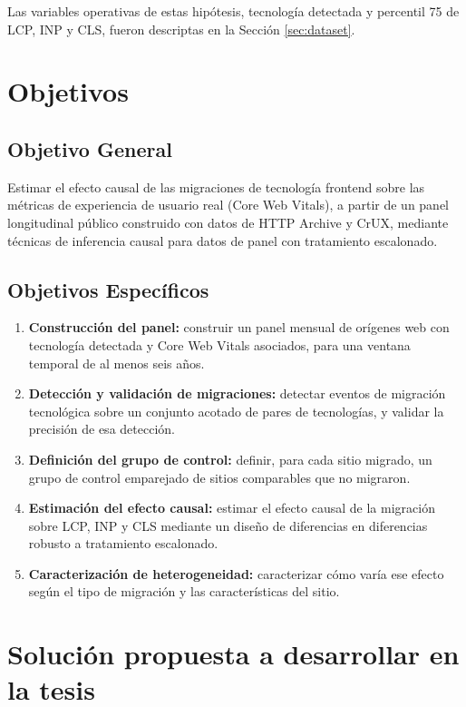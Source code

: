 \documentclass[12pt, a4paper]{article}
\begin{document}
Las variables operativas de estas hipótesis, tecnología detectada y percentil 75 de LCP, INP y CLS, fueron descriptas en la Sección \ref{sec:dataset}.

\section{Objetivos}

\subsection{Objetivo General}

Estimar el efecto causal de las migraciones de tecnología frontend sobre las métricas de experiencia de usuario real (Core Web Vitals), a partir de un panel longitudinal público construido con datos de HTTP Archive y CrUX, mediante técnicas de inferencia causal para datos de panel con tratamiento escalonado.

\subsection{Objetivos Específicos}

\begin{enumerate}
    \item \textbf{Construcción del panel:} construir un panel mensual de orígenes web con tecnología detectada y Core Web Vitals asociados, para una ventana temporal de al menos seis años.
    \item \textbf{Detección y validación de migraciones:} detectar eventos de migración tecnológica sobre un conjunto acotado de pares de tecnologías, y validar la precisión de esa detección.
    \item \textbf{Definición del grupo de control:} definir, para cada sitio migrado, un grupo de control emparejado de sitios comparables que no migraron.
    \item \textbf{Estimación del efecto causal:} estimar el efecto causal de la migración sobre LCP, INP y CLS mediante un diseño de diferencias en diferencias robusto a tratamiento escalonado.
    \item \textbf{Caracterización de heterogeneidad:} caracterizar cómo varía ese efecto según el tipo de migración y las características del sitio.
\end{enumerate}

\section{Solución propuesta a desarrollar en la tesis}
\label{sec:solucion}
\end{document}
